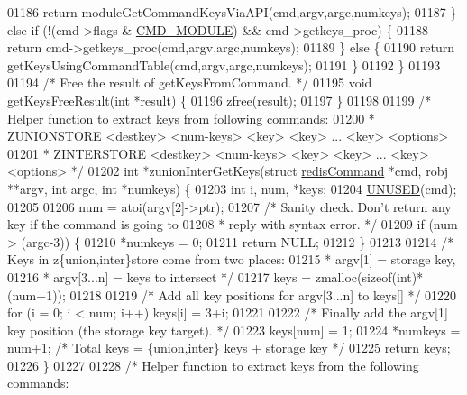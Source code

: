 \begin{DoxyCode}
01186         \textcolor{keywordflow}{return} moduleGetCommandKeysViaAPI(cmd,argv,argc,numkeys);
01187     \} \textcolor{keywordflow}{else} \textcolor{keywordflow}{if} (!(cmd->flags & \hyperlink{server_8h_accabd32f20281543986166c219124f9e}{CMD\_MODULE}) && cmd->getkeys\_proc) \{
01188         \textcolor{keywordflow}{return} cmd->getkeys\_proc(cmd,argv,argc,numkeys);
01189     \} \textcolor{keywordflow}{else} \{
01190         \textcolor{keywordflow}{return} getKeysUsingCommandTable(cmd,argv,argc,numkeys);
01191     \}
01192 \}
01193 
01194 \textcolor{comment}{/* Free the result of getKeysFromCommand. */}
01195 \textcolor{keywordtype}{void} getKeysFreeResult(\textcolor{keywordtype}{int} *result) \{
01196     zfree(result);
01197 \}
01198 
01199 \textcolor{comment}{/* Helper function to extract keys from following commands:}
01200 \textcolor{comment}{ * ZUNIONSTORE <destkey> <num-keys> <key> <key> ... <key> <options>}
01201 \textcolor{comment}{ * ZINTERSTORE <destkey> <num-keys> <key> <key> ... <key> <options> */}
01202 \textcolor{keywordtype}{int} *zunionInterGetKeys(\textcolor{keyword}{struct} \hyperlink{structredisCommand}{redisCommand} *cmd, robj **argv, \textcolor{keywordtype}{int} argc, \textcolor{keywordtype}{int} *numkeys) \{
01203     \textcolor{keywordtype}{int} i, num, *keys;
01204     \hyperlink{server_8h_ae7c9dc8f13568a9c856573751f1ee1ec}{UNUSED}(cmd);
01205 
01206     num = atoi(argv[2]->ptr);
01207     \textcolor{comment}{/* Sanity check. Don't return any key if the command is going to}
01208 \textcolor{comment}{     * reply with syntax error. */}
01209     \textcolor{keywordflow}{if} (num > (argc-3)) \{
01210         *numkeys = 0;
01211         \textcolor{keywordflow}{return} NULL;
01212     \}
01213 
01214     \textcolor{comment}{/* Keys in z\{union,inter\}store come from two places:}
01215 \textcolor{comment}{     * argv[1] = storage key,}
01216 \textcolor{comment}{     * argv[3...n] = keys to intersect */}
01217     keys = zmalloc(\textcolor{keyword}{sizeof}(\textcolor{keywordtype}{int})*(num+1));
01218 
01219     \textcolor{comment}{/* Add all key positions for argv[3...n] to keys[] */}
01220     \textcolor{keywordflow}{for} (i = 0; i < num; i++) keys[i] = 3+i;
01221 
01222     \textcolor{comment}{/* Finally add the argv[1] key position (the storage key target). */}
01223     keys[num] = 1;
01224     *numkeys = num+1;  \textcolor{comment}{/* Total keys = \{union,inter\} keys + storage key */}
01225     \textcolor{keywordflow}{return} keys;
01226 \}
01227 
01228 \textcolor{comment}{/* Helper function to extract keys from the following commands:}

\end{DoxyCode}
